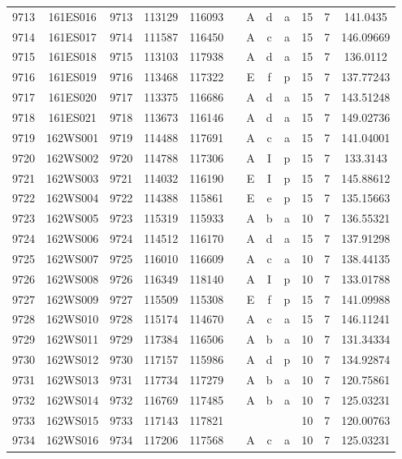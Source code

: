 \begin{tabular}{|*{12}{c|}}
9713 & 161ES016 & 9713 & 113129 & 116093 &  & A & d & a & 15 & 7 & 141.0435 \\ 
9714 & 161ES017 & 9714 & 111587 & 116450 &  & A & c & a & 15 & 7 & 146.09669 \\ 
9715 & 161ES018 & 9715 & 113103 & 117938 &  & A & d & a & 15 & 7 & 136.0112 \\ 
9716 & 161ES019 & 9716 & 113468 & 117322 &  & E & f & p & 15 & 7 & 137.77243 \\ 
9717 & 161ES020 & 9717 & 113375 & 116686 &  & A & d & a & 15 & 7 & 143.51248 \\ 
9718 & 161ES021 & 9718 & 113673 & 116146 &  & A & d & a & 15 & 7 & 149.02736 \\ 
9719 & 162WS001 & 9719 & 114488 & 117691 &  & A & c & a & 15 & 7 & 141.04001 \\ 
9720 & 162WS002 & 9720 & 114788 & 117306 &  & A & I & p & 15 & 7 & 133.3143 \\ 
9721 & 162WS003 & 9721 & 114032 & 116190 &  & E & I & p & 15 & 7 & 145.88612 \\ 
9722 & 162WS004 & 9722 & 114388 & 115861 &  & E & e & p & 15 & 7 & 135.15663 \\ 
9723 & 162WS005 & 9723 & 115319 & 115933 &  & A & b & a & 10 & 7 & 136.55321 \\ 
9724 & 162WS006 & 9724 & 114512 & 116170 &  & A & d & a & 15 & 7 & 137.91298 \\ 
9725 & 162WS007 & 9725 & 116010 & 116609 &  & A & c & a & 10 & 7 & 138.44135 \\ 
9726 & 162WS008 & 9726 & 116349 & 118140 &  & A & I & p & 10 & 7 & 133.01788 \\ 
9727 & 162WS009 & 9727 & 115509 & 115308 &  & E & f & p & 15 & 7 & 141.09988 \\ 
9728 & 162WS010 & 9728 & 115174 & 114670 &  & A & c & a & 15 & 7 & 146.11241 \\ 
9729 & 162WS011 & 9729 & 117384 & 116506 &  & A & b & a & 10 & 7 & 131.34334 \\ 
9730 & 162WS012 & 9730 & 117157 & 115986 &  & A & d & p & 10 & 7 & 134.92874 \\ 
9731 & 162WS013 & 9731 & 117734 & 117279 &  & A & b & a & 10 & 7 & 120.75861 \\ 
9732 & 162WS014 & 9732 & 116769 & 117485 &  & A & b & a & 10 & 7 & 125.03231 \\ 
9733 & 162WS015 & 9733 & 117143 & 117821 &  &  &  &  & 10 & 7 & 120.00763 \\ 
9734 & 162WS016 & 9734 & 117206 & 117568 &  & A & c & a & 10 & 7 & 125.03231 \\ 

\end{tabular}
